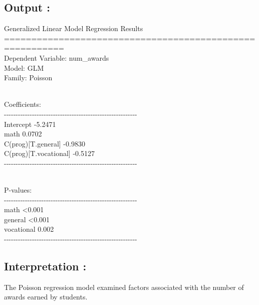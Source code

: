 \documentclass[
]{article}
\begin{document}
\subsection{\texorpdfstring{\textbf{Output
:}}{Output :}}\label{output-6}

Generalized Linear Model Regression Results\\
=========================================================\\
Dependent Variable: num\_awards\\
Model: GLM\\
Family: Poisson\\
\strut \\
Coefficients:\\
-\/-\/-\/-\/-\/-\/-\/-\/-\/-\/-\/-\/-\/-\/-\/-\/-\/-\/-\/-\/-\/-\/-\/-\/-\/-\/-\/-\/-\/-\/-\/-\/-\/-\/-\/-\/-\/-\/-\/-\/-\/-\/-\/-\/-\/-\/-\/-\/-\/-\/-\/-\/-\/-\/-\/-\/-\\
Intercept -5.2471\\
math 0.0702\\
C(prog){[}T.general{]} -0.9830\\
C(prog){[}T.vocational{]} -0.5127\\
-\/-\/-\/-\/-\/-\/-\/-\/-\/-\/-\/-\/-\/-\/-\/-\/-\/-\/-\/-\/-\/-\/-\/-\/-\/-\/-\/-\/-\/-\/-\/-\/-\/-\/-\/-\/-\/-\/-\/-\/-\/-\/-\/-\/-\/-\/-\/-\/-\/-\/-\/-\/-\/-\/-\/-\/-\\
\strut \\
P-values:\\
-\/-\/-\/-\/-\/-\/-\/-\/-\/-\/-\/-\/-\/-\/-\/-\/-\/-\/-\/-\/-\/-\/-\/-\/-\/-\/-\/-\/-\/-\/-\/-\/-\/-\/-\/-\/-\/-\/-\/-\/-\/-\/-\/-\/-\/-\/-\/-\/-\/-\/-\/-\/-\/-\/-\/-\/-\\
math \textless0.001\\
general \textless0.001\\
vocational 0.002\\
-\/-\/-\/-\/-\/-\/-\/-\/-\/-\/-\/-\/-\/-\/-\/-\/-\/-\/-\/-\/-\/-\/-\/-\/-\/-\/-\/-\/-\/-\/-\/-\/-\/-\/-\/-\/-\/-\/-\/-\/-\/-\/-\/-\/-\/-\/-\/-\/-\/-\/-\/-\/-\/-\/-\/-\/-

\subsection{\texorpdfstring{\textbf{Interpretation
:}}{Interpretation :}}\label{interpretation-15}

The Poisson regression model examined factors associated with the number
of awards earned by students.
\end{document}
